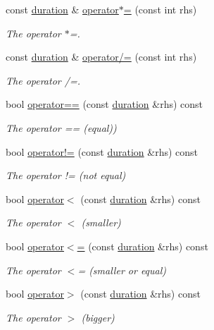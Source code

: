 \begin{DoxyCompactItemize}
const \hyperlink{classclock_1_1duration}{duration} \& \hyperlink{classclock_1_1duration_a9479ee9c4c62d26355b5dce4af3a021e}{operator$\ast$=} (const int rhs)
\begin{DoxyCompactList}\small\item\em The operator $\ast$=. \end{DoxyCompactList}\item 
const \hyperlink{classclock_1_1duration}{duration} \& \hyperlink{classclock_1_1duration_afde2d248fc62517f07239457aa88b98b}{operator/=} (const int rhs)
\begin{DoxyCompactList}\small\item\em The operator /=. \end{DoxyCompactList}\item 
bool \hyperlink{classclock_1_1duration_aec8dc5dfd2b8b1c0bdf1b0e5aefd6982}{operator==} (const \hyperlink{classclock_1_1duration}{duration} \&rhs) const 
\begin{DoxyCompactList}\small\item\em The operator == (equal)) \end{DoxyCompactList}\item 
bool \hyperlink{classclock_1_1duration_a84d6c5a5611f6e4aa625421cafa2d7ce}{operator!=} (const \hyperlink{classclock_1_1duration}{duration} \&rhs) const 
\begin{DoxyCompactList}\small\item\em The operator != (not equal) \end{DoxyCompactList}\item 
bool \hyperlink{classclock_1_1duration_aac0d52d4b154b28c84b68b9a00186307}{operator$<$} (const \hyperlink{classclock_1_1duration}{duration} \&rhs) const 
\begin{DoxyCompactList}\small\item\em The operator $<$ (smaller) \end{DoxyCompactList}\item 
bool \hyperlink{classclock_1_1duration_a4113c3402943184a4e5fa197f7f4a5a9}{operator$<$=} (const \hyperlink{classclock_1_1duration}{duration} \&rhs) const 
\begin{DoxyCompactList}\small\item\em The operator $<$= (smaller or equal) \end{DoxyCompactList}\item 
bool \hyperlink{classclock_1_1duration_a56c67f2c13ac7b7bfd90457b5265aec5}{operator$>$} (const \hyperlink{classclock_1_1duration}{duration} \&rhs) const 
\begin{DoxyCompactList}\small\item\em The operator $>$ (bigger) \end{DoxyCompactList}\item 

\end{DoxyCompactItemize}
